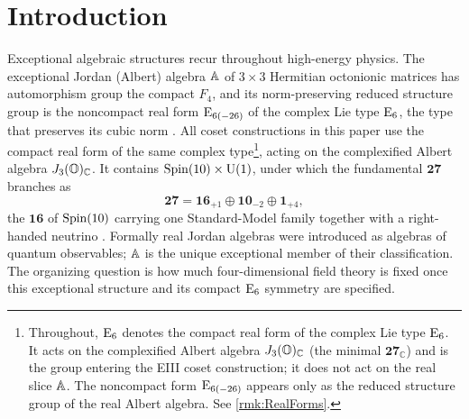 \documentclass[pdflatex,sn-mathphys-num]{sn-jnl}
\theoremstyle{thmstyleone}
\theoremstyle{thmstylethree}%
\theoremstyle{thmstyletwo}%
\begin{document}



\maketitle

\newpage

\tableofcontents

\newpage

\section{Introduction}



Exceptional algebraic structures recur throughout high-energy physics. The
exceptional Jordan (Albert) algebra $\mathbb{A}$ of $3\times3$ Hermitian octonionic
matrices has automorphism group the compact $F_{4}$, and its norm-preserving
reduced structure group is the noncompact real form $\mathrm{E}_{6(-26)}$ of the
complex Lie type $\mathrm{E}_{6}$, the type that preserves its cubic norm
\cite{Jacobson:1968,Springer:2000,McCrimmon:2004}. All coset constructions in
this paper use the compact real form of the same complex
type\footnote{Throughout, $\mathrm{E}_{6}$ denotes the compact real form of the complex
Lie type $\mathrm{E}_6$. It acts on the complexified Albert algebra $J_3(\mathbb{O})_{\mathbb C}$ (the
minimal $\mathbf{27}_{\mathbb C}$) and is the group entering the EIII coset
construction; it does not act on the real slice $\mathbb{A}$. The noncompact form
$\mathrm{E}_{6(-26)}$ appears only as the reduced structure group of the real Albert
algebra. See \autoref{rmk:RealForms}.}, acting on the complexified Albert
algebra $J_3(\mathbb{O})_{\mathbb C}$.
It contains $\operatorname{Spin}(10) \times \mathrm{U(1)}$, under which the fundamental
$\mathbf{27}$ branches as
\[
  \mathbf{27}=\mathbf{16}_{+1}\oplus\mathbf{10}_{-2}\oplus\mathbf{1}_{+4},
\]
the $\mathbf{16}$ of $\operatorname{Spin}(10)$ carrying one Standard-Model family together
with a right-handed neutrino \cite{Slansky:1981}. Formally real Jordan algebras
were introduced as algebras of quantum observables; $\mathbb{A}$ is the unique
exceptional member of their classification. The organizing question is how much
four-dimensional field theory is fixed once this exceptional structure and its
compact $\mathrm{E}_{6}$ symmetry are specified.
\end{document}
